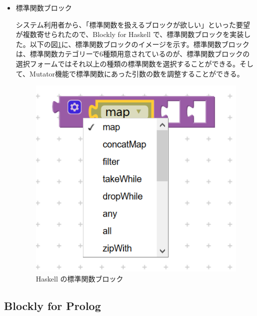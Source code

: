 \documentclass{risepaper}
\begin{document}
\begin{itemize}
\item 標準関数ブロック

システム利用者から、「標準関数を扱えるブロックが欲しい」といった要望が複数寄せられたので、Blockly for Haskell で、標準関数ブロックを実装した。以下の図\ref{fig:haskell_standard_functions}に、標準関数ブロックのイメージを示す。標準関数ブロックは、標準関数カテゴリーで6種類用意されているのが、標準関数ブロックの選択フォームではそれ以上の種類の標準関数を選択することができる。そして、Mutator機能で標準関数にあった引数の数を調整することができる。

\begin{figure}[h]
\begin{center}
\includegraphics[scale=0.5]{img/haskell_standard_functions.PNG}
\caption{Haskell の標準関数ブロック}%
\label{fig:haskell_standard_functions}
\end{center}%
\end{figure}%

\end{itemize} 

   \subsection{Blockly for Prolog}
   
\end{document}
